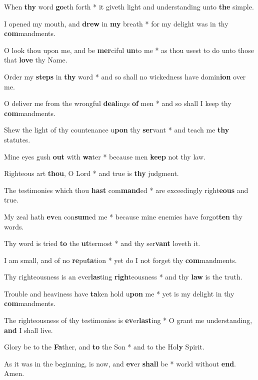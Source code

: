 \begin{multicols}{2}
	When \textbf{thy} word \textbf{go}eth forth * it giveth light and understanding unto \textbf{the} simple.
	
	I opened my mouth, and \textbf{drew} in \textbf{my} breath * for my delight was in thy \textbf{com}mandments.
	
	O look thou upon me, and be \textbf{mer}ciful \textbf{un}to me * as thou usest to do unto those that \textbf{love} thy Name.
	
	Order my \textbf{steps} in \textbf{thy} word * and so shall no wickedness have domin\textbf{ion} over me.
	
	O deliver me from the wrongful \textbf{deal}ings \textbf{of} men * and so shall I keep thy \textbf{com}mandments.
	
	Shew the light of thy countenance u\textbf{pon} thy \textbf{ser}vant * and teach me \textbf{thy} statutes.
	
	Mine eyes gush \textbf{out} with \textbf{wa}ter * because men \textbf{keep} not thy law.
	
	Righteous art \textbf{thou}, O Lord * and true is \textbf{thy} judgment.
	
	The testimonies which thou \textbf{hast} com\textbf{mand}ed * are exceedingly right\textbf{eous} and true.
	
	My zeal hath \textbf{ev}en con\textbf{sum}ed me * because mine enemies have forgot\textbf{ten} thy words.
	
	Thy word is tried \textbf{to} the \textbf{ut}termost * and thy ser\textbf{vant} loveth it.
	
	I am small, and of no \textbf{re}pu\textbf{ta}tion * yet do I not forget thy \textbf{com}mandments.
	
	Thy righteousness is an ever\textbf{las}ting \textbf{righ}teousness * and thy \textbf{law} is the truth.
	
	Trouble and heaviness have \textbf{ta}ken hold u\textbf{pon} me * yet is my delight in thy \textbf{com}mandments.
	
	The righteousness of thy testimonies is \textbf{ev}er\textbf{last}ing * O grant me understanding, \textbf{and} I shall live.
	
	Glory be to the \textbf{Fa}ther, and \textbf{to} the Son * and to the Ho\textbf{ly} Spirit.
	
	As it was in the beginning, is now, and \textbf{ev}er \textbf{shall} be * world without \textbf{end}. Amen.
\end{multicols}